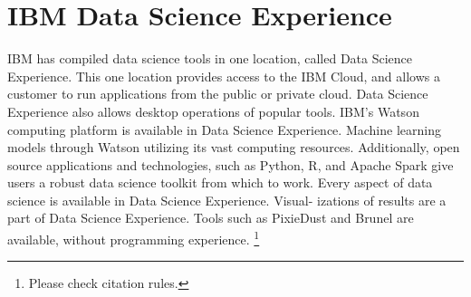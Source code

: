 \section{IBM Data Science Experience}

IBM has compiled data science tools in one location, 
called Data Science Experience. This one location provides
access to the IBM Cloud, and allows a customer to run 
applications from the public or private cloud. 
\cite{hid-sp18-525-dsx}
Data Science Experience also allows desktop operations 
of popular tools. \cite{hid-sp18-525-dsx}
IBM’s Watson computing platform is available in Data Science
Experience. Machine learning models through Watson utilizing
its vast computing resources. Additionally, open source 
applications and technologies, such as Python, R, and Apache 
Spark give users a robust data science toolkit from which to
work. \cite{hid-sp18-525-dsx}
Every aspect of data science is available in Data Science 
Experience. Visual- izations of results are a part of Data 
Science Experience. Tools such as PixieDust and Brunel are 
available, without programming
experience. \cite{hid-sp18-525-dsx}\footnote{Please check citation rules.}

